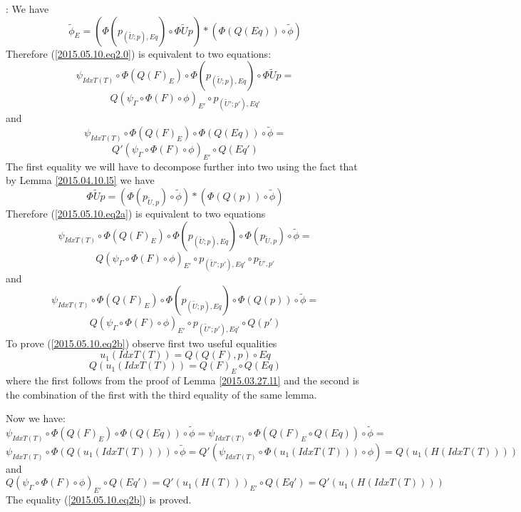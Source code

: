 \documentclass[12pt]{article}
\newenvironment{eq}{\begin{equation}}{\end{equation}}
\newenvironment{myproof}{{\bf Proof}:}{\vskip 5mm }
\newcommand{\llabel}[1]{\label{#1}}
\newcommand{\wt}{\widetilde}
\begin{document}
\begin{myproof}
We have 
%
$$\wt{\phi}_E=(\Phi(p_{(\wt{U};p),Eq})\circ \Phi\wt{U}p)*(\Phi(Q(Eq))\circ\wt{\phi})$$
%
Therefore (\ref{2015.05.10.eq2.0}) is equivalent to two equations:
%
$$\psi_{IdxT(T)}\circ \Phi(Q(F)_E)\circ \Phi(p_{(\wt{U};p),Eq})\circ \Phi\wt{U}p=$$
\begin{eq}
\label{2015.05.10.eq2a}
Q(\psi_{\Gamma}\circ \Phi(F)\circ \phi)_{E'}\circ p_{(\wt{U}';p'),Eq'}
\end{eq}
%
and
%
$$\psi_{IdxT(T)}\circ \Phi(Q(F)_E)\circ \Phi(Q(Eq))\circ\wt{\phi}=$$
\begin{eq}
\label{2015.05.10.eq2b}
Q'(\psi_{\Gamma}\circ \Phi(F)\circ \phi)_{E'}\circ Q(Eq')
\end{eq}
%
The first equality we will have to decompose further into two using the fact that by Lemma \ref{2015.04.10.l5} we have 
%
$$\Phi\wt{U}p=(\Phi(p_{\wt{U},p})\circ\wt{\phi})*(\Phi(Q(p))\circ \wt{\phi})$$
%
Therefore (\ref{2015.05.10.eq2a}) is equivalent to two equations
%
$$\psi_{IdxT(T)}\circ \Phi(Q(F)_E)\circ \Phi(p_{(\wt{U};p),Eq})\circ \Phi(p_{\wt{U},p})\circ\wt{\phi}=$$
\begin{eq}
\llabel{2015.05.10.eq2aa}
Q(\psi_{\Gamma}\circ \Phi(F)\circ \phi)_{E'}\circ p_{(\wt{U}';p'),Eq'}\circ p_{\wt{U}',p'}
\end{eq}
%
and
%
$$\psi_{IdxT(T)}\circ \Phi(Q(F)_E)\circ \Phi(p_{(\wt{U};p),Eq})\circ \Phi(Q(p))\circ\wt{\phi}=$$
\begin{eq}
\llabel{2015.05.10.eq2ab}
Q(\psi_{\Gamma}\circ \Phi(F)\circ \phi)_{E'}\circ p_{(\wt{U}';p'),Eq'}\circ Q(p')
\end{eq}
%
To prove (\ref{2015.05.10.eq2b}) observe first two useful equalities
%
$$u_1(IdxT(T))=Q(Q(F),p)\circ Eq$$
%
$$Q(u_1(IdxT(T)))=Q(F)_{E}\circ Q(Eq)$$
%
where the first follows from the proof of Lemma \ref{2015.03.27.l1} and the second is the combination of the first with the third equality of the same lemma. 

Now we have:
%
$$\psi_{IdxT(T)}\circ \Phi(Q(F)_E)\circ \Phi(Q(Eq))\circ\wt{\phi}=\psi_{IdxT(T)}\circ \Phi(Q(F)_E\circ Q(Eq))\circ\wt{\phi}=$$
$$\psi_{IdxT(T)}\circ \Phi(Q(u_1(IdxT(T))))\circ \wt{\phi}=Q'(\psi_{IdxT(T)}\circ \Phi(u_1(IdxT(T)))\circ \phi)=Q(u_1(H(IdxT(T))))$$
%
and
%
$$Q(\psi_{\Gamma}\circ \Phi(F)\circ \phi)_{E'}\circ Q(Eq')=Q'(u_1(H(T)))_{E'}\circ Q(Eq')=Q'(u_1(H(IdxT(T))))$$
%
The equality (\ref{2015.05.10.eq2b}) is proved. 


\end{myproof}
\end{document}
